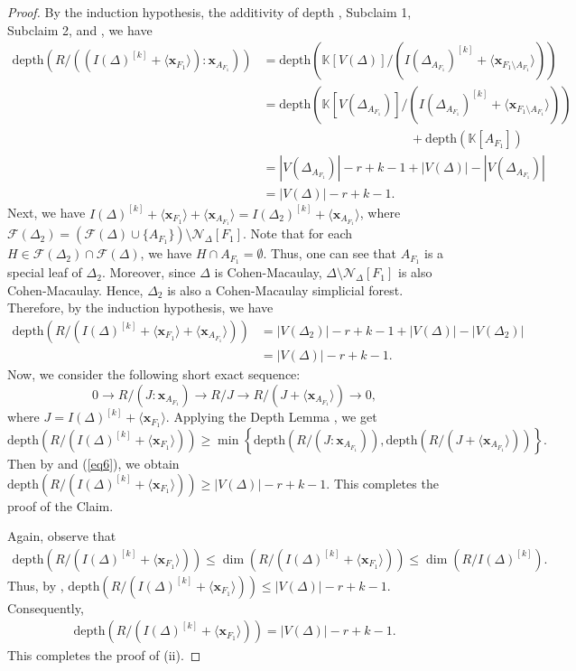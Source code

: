 \documentclass[12pt,a4paper,reqno]{amsart}
\theoremstyle{definition}
\def\K{\mathbb{K}}
\def\D{\Delta}
\def\F{\mathcal{F}}
\def\N{\mathcal{N}}
\def\d{\mathrm{depth}}
\def\l{\langle}
\def\r{\rangle}
\def\x{\mathbf x}
\begin{document}
\begin{proof}
By the induction hypothesis, the additivity of depth \cite[Theorem 3.1.34]{RHV}, Subclaim 1, Subclaim 2, and , we have 
\begin{equation}\label{eq5}
    \begin{split}
        \d(R/((I(\Delta)^{[k]}+\l \x_{F_1}\r):\x_{A_{F_1}}))
        &=\d(\K[V(\D)]/(I(\D_{A_{F_1}})^{[k]}
        +\l \x_{F_1\setminus A_{F_1}}\r))\\
        &=\d(\K[V(\D_{A_{F_1}})]/(I(\D_{A_{F_1}})^{[k]}
        +\l \x_{F_1\setminus A_{F_1}}\r))\\
        & \hspace{140pt}  +\d(\K[A_{F_1}])\\
        &=|V(\Delta_{A_{F_1}})|-r+k-1+|V(\D)|-|V(\D_{A_{F_1}})|\\
        &=|V(\Delta)|-r+k-1.
    \end{split}
\end{equation}
Next, we have $I(\Delta)^{[k]}+\l \x_{F_1}\r+\l \x_{A_{F_1}}\r=I(\Delta_2)^{[k]}+\l \x_{A_{F_1}}\r$, where $\F(\Delta_2)=(\F(\Delta)\cup\{A_{F_1}\})\setminus \N_{\Delta}[F_1]$. Note that for each $H\in\F(\D_2)\cap\F(\D)$, we have $H\cap A_{F_1}=\emptyset$. Thus, one can see that $A_{F_1}$ is a special leaf of $\Delta_2$. Moreover, since $\Delta$ is Cohen-Macaulay, $\Delta\setminus \N_{\Delta}[F_1]$ is also Cohen-Macaulay. Hence, $\Delta_2$ is also a Cohen-Macaulay simplicial forest. Therefore, by the induction hypothesis, we have
\begin{equation}\label{eq6}
    \begin{split}
    \d(R/(I(\Delta)^{[k]}+\l \x_{F_1}\r+\l \x_{A_{F_1}}\r))&=|V(\Delta_2)|-r+k-1+|V(\Delta)|-|V(\Delta_2)|\\
    &=|V(\Delta)|-r+k-1.
\end{split}
\end{equation}
Now, we consider the following short exact sequence:
\[
0\rightarrow R/(J:\x_{A_{F_1}})\rightarrow R/J\rightarrow R/(J+\l \x_{A_{F_1}}\r)\rightarrow 0,
\]
where $J=I(\Delta)^{[k]}+\l \x_{F_1}\r$. Applying the Depth Lemma \cite[Lemma 2.3.9]{RHV}, we get 
\[
\d(R/(I(\Delta)^{[k]}+\l\x_{F_1}\r))\ge \min\left\{\d(R/(J:\x_{A_{F_1}})), \d(R/(J+\l \x_{A_{F_1}}\r))\right\}.
\]
Then by   and (\ref{eq6}), we obtain
$\d(R/(I(\Delta)^{[k]}+\l\x_{F_1}\r))\ge |V(\Delta)|-r+k-1$. This completes the proof of the Claim. \par 

Again, observe that 
\begin{align*}
\d(R/(I(\Delta)^{[k]}+\l\x_{F_1}\r))\le \dim(R/(I(\Delta)^{[k]}+\l\x_{F_1}\r))\le \dim(R/I(\Delta)^{[k]}).    
\end{align*}
Thus, by , $\d(R/(I(\Delta)^{[k]}+\l\x_{F_1}\r))\leq|V(\Delta)|-r+k-1$. Consequently, 
\begin{align}\label{eq7}
    \d(R/(I(\Delta)^{[k]}+\l\x_{F_1}\r))=|V(\Delta)|-r+k-1.
\end{align}
This completes the proof of (ii).


\end{proof}
\end{document}
